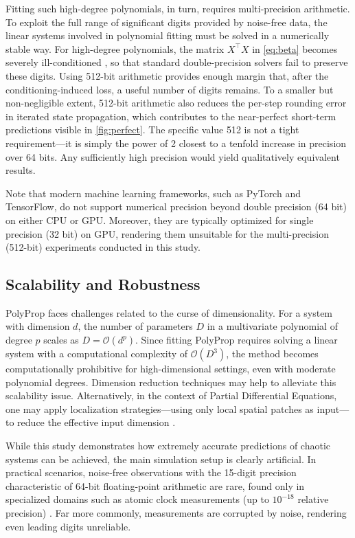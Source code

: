 \documentclass{article}
\begin{document}
Fitting such high-degree polynomials, in turn, requires multi-precision arithmetic. To exploit the full range of significant digits provided by noise-free data, the linear systems involved in polynomial fitting must be solved in a numerically stable way. For high-degree polynomials, the matrix $X^\top X$ in \eqref{eq:beta} becomes severely ill-conditioned \citep{Santos2025}, so that standard double-precision solvers fail to preserve these digits. Using 512-bit arithmetic provides enough margin that, after the conditioning-induced loss, a useful number of digits remains. To a smaller but non-negligible extent, 512-bit arithmetic also reduces the per-step rounding error in iterated state propagation, which contributes to the near-perfect short-term predictions visible in \cref{fig:perfect}. The specific value 512 is not a tight requirement---it is simply the power of 2 closest to a tenfold increase in precision over 64 bits. Any sufficiently high precision would yield qualitatively equivalent results.

Note that modern machine learning frameworks, such as PyTorch and TensorFlow, do not support numerical precision beyond double precision (64 bit) on either CPU or GPU. Moreover, they are typically optimized for single precision (32 bit) on GPU, rendering them unsuitable for the multi-precision (512-bit) experiments conducted in this study.


\subsection{Scalability and Robustness}

PolyProp faces challenges related to the curse of dimensionality. For a system with dimension $d$, the number of parameters $D$ in a multivariate polynomial of degree $p$ scales as $D = \mathcal{O}(d^p)$. Since fitting PolyProp requires solving a linear system with a computational complexity of $\mathcal{O}(D^3)$, the method becomes computationally prohibitive for high-dimensional settings, even with moderate polynomial degrees. Dimension reduction techniques may help to alleviate this scalability issue. Alternatively, in the context of Partial Differential Equations, one may apply localization strategies---using only local spatial patches as input---to reduce the effective input dimension \citep{Mandal2025}.

While this study demonstrates how extremely accurate predictions of chaotic systems can be achieved, the main simulation setup is clearly artificial. In practical scenarios, noise-free observations with the 15-digit precision characteristic of 64-bit floating-point arithmetic are rare, found only in specialized domains such as atomic clock measurements (up to $10^{-18}$ relative precision) \cite{Nicholson2015}. Far more commonly, measurements are corrupted by noise, rendering even leading digits unreliable. 
\end{document}
